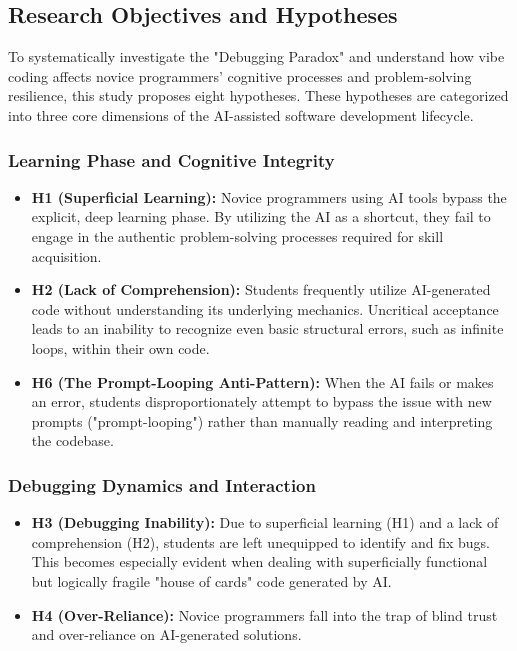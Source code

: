 \documentclass[../tanulmany.tex]{subfiles}
\begin{document}
\subsection{Research Objectives and Hypotheses}

To systematically investigate the "Debugging Paradox" and understand how vibe coding affects novice programmers' cognitive processes and problem-solving resilience, this study proposes eight hypotheses.
These hypotheses are categorized into three core dimensions of the AI-assisted software development lifecycle.

\subsubsection{Learning Phase and Cognitive Integrity}

  \begin{itemize}
    \item \textbf{H1 (Superficial Learning):}
          Novice programmers using AI tools bypass the explicit, deep learning phase.
          By utilizing the AI as a shortcut, they fail to engage in the authentic problem-solving processes required for skill acquisition.

    \item \textbf{H2 (Lack of Comprehension):}
          Students frequently utilize AI-generated code without understanding its underlying mechanics.
          Uncritical acceptance leads to an inability to recognize even basic structural errors, such as infinite loops, within their own code.

    \item \textbf{H6 (The Prompt-Looping Anti-Pattern):}
          When the AI fails or makes an error, students disproportionately attempt to bypass the issue with new prompts ("prompt-looping") rather than manually reading and interpreting the codebase.
  \end{itemize}

\subsubsection{Debugging Dynamics and Interaction}

  \begin{itemize}
    \item \textbf{H3 (Debugging Inability):}
          Due to superficial learning (H1) and a lack of comprehension (H2), students are left unequipped to identify and fix bugs.
          This becomes especially evident when dealing with superficially functional but logically fragile "house of cards" code generated by AI.

    \item \textbf{H4 (Over-Reliance):}
          Novice programmers fall into the trap of blind trust and over-reliance on AI-generated solutions.
  \end{itemize}
\end{document}
